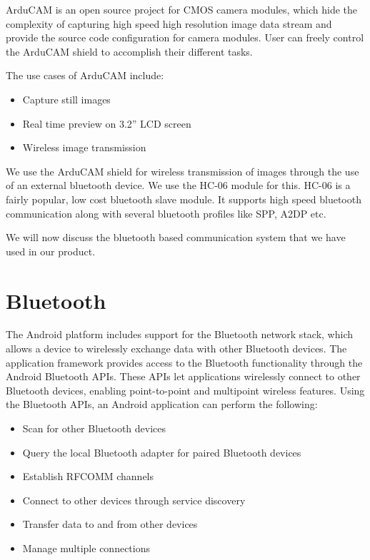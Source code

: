 \documentclass[11pt]{report}
\begin{document}
ArduCAM is an open source project for CMOS camera modules, which hide the complexity of capturing high speed high resolution image data stream and provide the source code configuration for camera modules. User can freely control the ArduCAM shield to accomplish their different tasks.

The use cases of ArduCAM include:

\begin{itemize}
\item Capture still images
\item Real time preview on 3.2” LCD screen
\item Wireless image transmission
\end{itemize}

We use the ArduCAM shield for wireless transmission of images through the use of an external bluetooth device. We use the HC-06 module for this. HC-06 is a fairly popular, low cost bluetooth slave module. It supports high speed bluetooth communication along with several bluetooth profiles like SPP, A2DP etc.

We will now discuss the bluetooth based communication system that we have used in our product.
\section{Bluetooth}
The Android platform includes support for the Bluetooth network stack, which allows a device to wirelessly exchange data with other Bluetooth devices. The application framework provides access to the Bluetooth functionality through the Android Bluetooth APIs\cite{androiddevguide}. These APIs let applications wirelessly connect to other Bluetooth devices, enabling point-to-point and multipoint wireless features.
Using the Bluetooth APIs, an Android application can perform the following:

\begin{itemize}
\item Scan for other Bluetooth devices
\item Query the local Bluetooth adapter for paired Bluetooth devices
\item Establish RFCOMM channels
\item Connect to other devices through service discovery
\item Transfer data to and from other devices
\item Manage multiple connections
\end{itemize}
\end{document}

